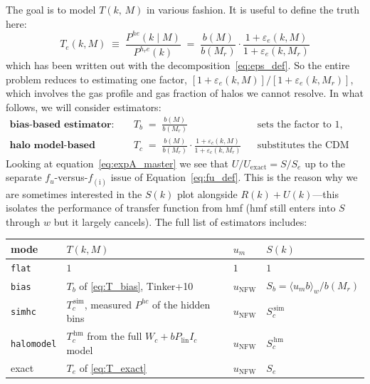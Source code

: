\documentclass{article}
\begin{document}
The goal is to model $T(k, \, M)$ in various fashion. It is useful to define the truth here:
\begin{equation} \label{eq:T_exact}
    T_e(k,M) \;\equiv\; \frac{P^{he}(k \mid M)}{P^{h_re}(k)}
    \;=\; \frac{b(M)}{b(M_r)} \cdot \frac{1 + \varepsilon_e(k,M)}{1 + \varepsilon_e(k,M_r)}
\end{equation}
which has been written out with the decomposition~\eqref{eq:eps_def}. So the entire problem reduces to estimating one factor, $[1+\varepsilon_e(k,M)]/[1+\varepsilon_e(k,M_r)]$, which involves the gas profile and gas fraction of halos we cannot resolve. In what follows, we will consider estimators:
\begin{align}
    \textbf{bias-based estimator:} \quad & T_b \;=\; \frac{b(M)}{b(M_r)}
    &&\text{sets the factor to } 1, \label{eq:T_bias} \\[0.5ex]
    \textbf{halo model-based estimator:} \quad & T_c \;=\; \frac{b(M)}{b(M_r)} \cdot \frac{1 + \varepsilon_c(k,M)}{1 + \varepsilon_c(k,M_r)}
    &&\text{substitutes the CDM analogue,} \label{eq:T_halomodel}
\end{align}
Looking at equation~\eqref{eq:expA_master} we see that $U/U_\mathrm{exact} = S/S_e$ up to the separate $f_u$-versus-$f_\mathrm{(i)}$ issue of Equation~\eqref{eq:fu_def}. This is the reason why we are sometimes interested in the $S(k)$ plot alongside $R(k) + U(k)$---this isolates the performance of transfer function from hmf (hmf still enters into $S$ through $w$ but it largely cancels). The full list of estimators includes:
 
\begin{center}
\renewcommand{\arraystretch}{1.2} 
\begin{tabular}{llll}
\hline
mode & $T(k,M)$ & $u_m$ & $S(k)$ \\
\hline
\texttt{flat}      & $1$ & $1$ & $ 1$ \\
\texttt{bias}      & $T_b$ of \eqref{eq:T_bias}, Tinker+10 & $u_\mathrm{NFW}$ & $S_b = \langle u_m b \rangle_w / b(M_r)$ \\
\texttt{simhc}     & $T_c^\mathrm{\,sim}$, measured $P^{hc}$ of the hidden bins & $u_\mathrm{NFW}$ & $S_c^\mathrm{\,sim}$ \\
\texttt{halomodel} & $T_c^\mathrm{\,hm}$ from the full $W_c + bP_\mathrm{lin}I_c$ model & $u_\mathrm{NFW}$ & $S_c^\mathrm{\,hm}$ \\
\hline
exact              & $T_e$ of \eqref{eq:T_exact} & $u_\mathrm{NFW}$ & $S_e$ \\
\hline
\end{tabular}
\end{center}
 
\end{document}
